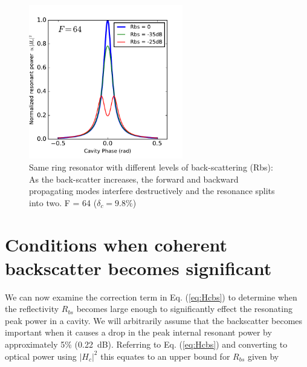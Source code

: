 \documentclass[10pt]{article}
\begin{document}





\begin{figure}[htbp]
\centering\includegraphics[width=0.6\textwidth]{figures/bs_split.pdf}
\caption{Same ring resonator with different levels of back-scattering (Rbs):
As the back-scatter increases, the forward and backward propagating modes interfere destructively and the resonance splits into two.
F = 64 ($\delta_c = 9.8\%$)} 
\label{fig:bs_split}
\end{figure}


\section{Conditions when coherent backscatter becomes significant}
We can now examine the correction term in Eq. (\ref{eq:Hcbs}) to determine when the reflectivity $R_{bs}$ becomes large enough to significantly effect the resonating peak power in a cavity.   We will arbitrarily assume that the backscatter becomes important when it causes a drop in the peak internal resonant power by approximately 5\% (0.22~dB).  Referring to Eq. (\ref{eq:Hcbs}) and  converting to optical power using $|H_c|^2$ this equates to an upper bound for $R_{bs}$ given by
\end{document}
